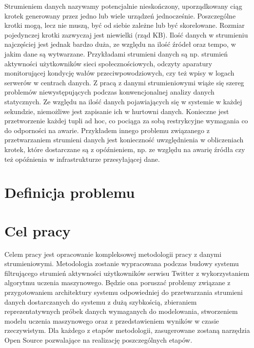Strumieniem danych nazywamy potencjalnie nieskończony, uporządkowany ciąg krotek generowany przez jedno lub wiele urządzeń jednocześnie. Poszczególne krotki mogą, lecz nie muszą, być od siebie zależne lub być skorelowane. Rozmiar pojedynczej krotki zazwyczaj jest niewielki (rząd KB). Ilość danych w strumieniu najczęściej jest jednak bardzo duża, ze względu na ilość źródeł oraz tempo, w jakim dane są wytwarzane. Przykładami strumieni danych są np. strumień aktywności użytkowników sieci społecznościowych, odczyty aparatury monitorującej kondycję wałów przeciwpowodziowych, czy też wpisy w logach serwerów w centrach danych. Z pracą z danymi strumieniowymi wiąże się szereg problemów niewystępujących podczas konwencjonalnej analizy danych statycznych. Ze względu na ilość danych pojawiających się w systemie w każdej sekundzie, niemożliwe jest zapisanie ich w hurtowni danych. Konieczne jest przetworzenie każdej tupli ad hoc, co pociąga za sobą restrykcyjne wymagania co do odporności na awarie. Przykładem innego problemu związanego z przetwarzaniem strumieni danych jest konieczność uwzględnienia w obliczeniach krotek, które dostarczane są z opóźnieniem, np. ze względu na awarię źródła czy też opóźnienia w infrastrukturze przesyłającej dane.

\section{Definicja problemu}



\section{Cel pracy}

Celem pracy jest opracowanie kompleksowej metodologii pracy z danymi strumieniowymi. Metodologia zostanie wypracowana podczas budowy systemu filtrującego strumień aktywności użytkowników serwisu Twitter z wykorzystaniem algorytmu uczenia maszynowego. Będzie ona poruszać problemy związane z przygotowaniem architektury systemu odpowiedniej do przetwarzania strumieni danych dostarczanych do systemu z dużą szybkością, zbieraniem reprezentatywnych próbek danych wymaganych do modelowania, stworzeniem modelu uczenia maszynowego oraz z przedstawieniem wyników w czasie rzeczywistym. Dla każdego z etapów metodologii, zasugerowane zostaną narzędzia Open Source pozwalające na realizację poszczególnych etapów.

